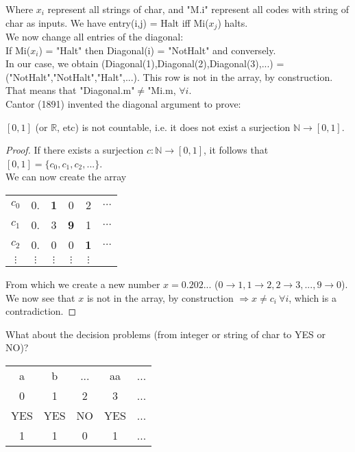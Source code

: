 Where $x_i$ represent all strings of char, and "M.i" represent all codes with string of char as inputs. We have entry(i,j) = Halt iff Mi($x_j$) halts.\\

We now change all entries of the diagonal:\\
If Mi($x_i$) = "Halt" then Diagonal(i) = "NotHalt" and conversely.\\

In our case, we obtain (Diagonal(1),Diagonal(2),Diagonal(3),...) = ("NotHalt","NotHalt","Halt",...). This row is not in the array, by construction. That means that "Diagonal.m"$\neq$"Mi.m, $\forall i$.\\

Cantor (1891) invented the diagonal argument to prove:
\begin{theorem}
$[0,1]$ (or $\mathbb{R}$, etc) is not countable, i.e. it does not exist a surjection $\mathbb{N}\rightarrow [0,1]$. 
\end{theorem}
\begin{proof}
If there exists a surjection $c:\mathbb{N}\rightarrow [0,1]$, it follows that $[0,1] = \{ c_0,c_1,c_2,...\}$.\\

We can now create the array
\begin{tabular}{c|ccccc}
	\hline
 	$c_0$ & 0. & \textbf{1} & 0 & 2 & $\hdots$  \\
 	$c_1$ & 0. & 3 & \textbf{9} & 1 & $\hdots$  \\
 	$c_2$ & 0. & 0 & 0 & \textbf{1}& $\hdots$  \\
 	$\vdots$ & $\vdots$ & $\vdots$ & $\vdots$ & $\vdots$ &  \\
\end{tabular}

From which we create a new number $x=0.202...$ ($0\rightarrow 1, 1\rightarrow 2, 2\rightarrow 3, ..., 9\rightarrow 0$). We now see that $x$ is not in the array, by construction $\Rightarrow x \neq c_i ~ \forall i$, which is a contradiction.
\end{proof}

What about the decision problems (from integer or string of char to YES or NO)?

\begin{center}
\begin{tabular}{ccccc}
	a & b & ... & aa & ...\\
	0 & 1 & 2 & 3 & ... \\
	\hline
	YES & YES & NO & YES & ...\\
	\hline
	1 & 1 & 0 & 1 & ...\\
	\hline
\end{tabular}
\end{center}

